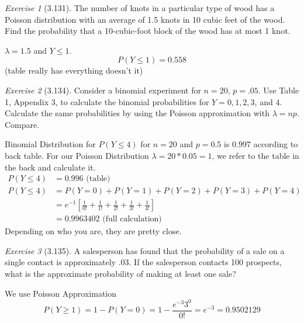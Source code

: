 \documentclass[12pt]{amsart}
\makeatletter
\theoremstyle{remark}
\newtheorem*{exercise}{Exercise}%
\renewenvironment{proof}[1][\proofname]{\par\doublespacing
  \pushQED{\qed}%
  \normalfont \topsep6\p@\@plus6\p@\relax
  \list{}{%
    \settowidth{\leftmargin}{\itshape\proofname:\hskip\labelsep}%
    \setlength{\labelwidth}{0pt}%
    \setlength{\itemindent}{-\leftmargin}%
  }%
  \item[\hskip\labelsep\itshape#1\@addpunct{:}]\ignorespaces
}{%
  \popQED\endlist\@endpefalse
  \singlespacing
}
\theoremstyle{mycomment}
\makeatother
\begin{document}
\begin{exercise}[3.131]
The number of knots in a particular type of wood has a Poisson distribution with an average of 1.5 knots in 10 cubic feet of the wood. Find the probability that a 10-cubic-foot block of the wood has at most 1 knot.

\begin{proof}[Solution]
	$\lambda = 1.5$ and $Y \leq 1$.
	$$P(Y \leq 1) = 0.558 $$
	(table really has everything doesn't it) 
\end{proof}
\end{exercise}

\begin{exercise}[3.134]
Consider a binomial experiment for $n = 20$, $p = .05$. Use Table 1, Appendix 3, to calculate the binomial probabilities for $Y = 0, 1, 2, 3$, and $4$. Calculate the same probabilities by using the Poisson approximation with $\lambda = np$. Compare.

\begin{proof}[Solution]
	Binomial Distribution for $P(Y \leq 4)$ for $n = 20$ and $p = 0.5$ is $0.997$ according to back table. For 
	our Poisson Distribution $\lambda = 20*0.05 = 1$, we refer to the table in the back and calculate it.
	\begin{align*}
		P(Y \leq 4) &= 0.996 \text{ (table)} \\
		P(Y \leq 4) &= P(Y = 0) + P(Y = 1) + P(Y = 2) + P(Y=3) + P(Y = 4) \\
			&= e^{-1}[\frac{1}{0!} + \frac{1}{1!} + \frac{1}{2!}+ \frac{1}{3!}+ \frac{1}{4!}] \\
			&= 0.9963402 \text{ (full calculation)}
	\end{align*}
	Depending on who you are, they are pretty close.
\end{proof}
\end{exercise}

\begin{exercise}[3.135]
A salesperson has found that the probability of a sale on a single contact is approximately .03. If the salesperson contacts 100 prospects, what is the approximate probability of making at least one sale?

\begin{proof}[Solution]
We use Poisson Approximation
	$$P(Y \geq 1) = 1 - P(Y = 0) = 1 - \frac{e^{-3} 3^0}{0!} = e^{-3} = 0.9502129$$
\end{proof}
\end{exercise}
\end{document}
